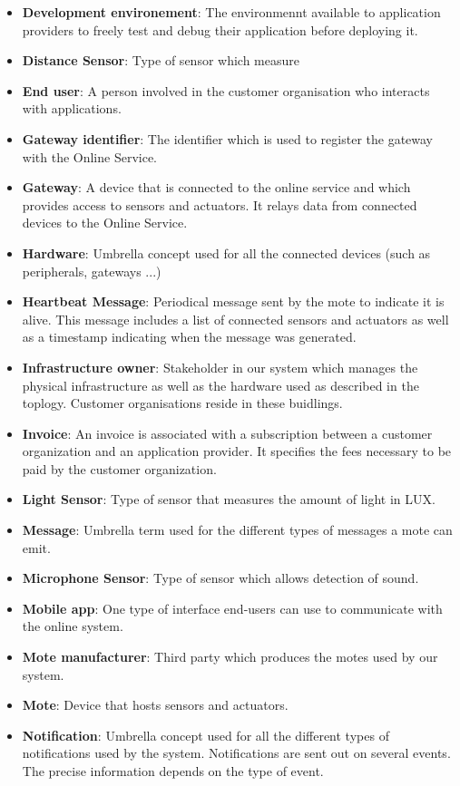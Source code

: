\documentclass[english]{sareport}
\begin{document}
\begin{itemize}
	\item \textbf{Development environement}: The environmennt available to application providers to freely test and debug their application before deploying it.
	\item \textbf{Distance Sensor}: Type of sensor which measure 
	\item \textbf{End user}: A person involved in the customer organisation who interacts with applications.
	\item \textbf{Gateway identifier}: The identifier which is used to register the gateway with the Online Service.
	\item \textbf{Gateway}: A device that is connected to the online service and which provides access to sensors and actuators. It relays data from connected devices to the Online Service.
	\item \textbf{Hardware}: Umbrella concept used for all the connected devices (such as peripherals, gateways ...)
	\item \textbf{Heartbeat Message}: Periodical message sent by the mote to indicate it is alive. This message includes a list of connected sensors and actuators as well as a timestamp indicating when the message was generated.
	\item \textbf{Infrastructure owner}: Stakeholder in our system which manages the physical infrastructure as well as the hardware used as described in the toplogy. Customer organisations reside in these buidlings.
	\item \textbf{Invoice}: An invoice is associated with a subscription between a customer organization and an application provider. It specifies the fees necessary to be paid by the customer organization.
	\item \textbf{Light Sensor}: Type of sensor that measures the amount of light in LUX.
	\item \textbf{Message}: Umbrella term used for the different types of messages a mote can emit.
	\item \textbf{Microphone Sensor}: Type of sensor which allows detection of sound. 
	\item \textbf{Mobile app}: One type of interface end-users can use to communicate with the online system.
	\item \textbf{Mote manufacturer}: Third party which produces the motes used by our system.
	\item \textbf{Mote}: Device that hosts sensors and actuators.
	\item \textbf{Notification}: Umbrella concept used for all the different types of notifications used by the system. Notifications are sent out on several events. The precise information depends on the type of event.

\end{itemize}
\end{document}
